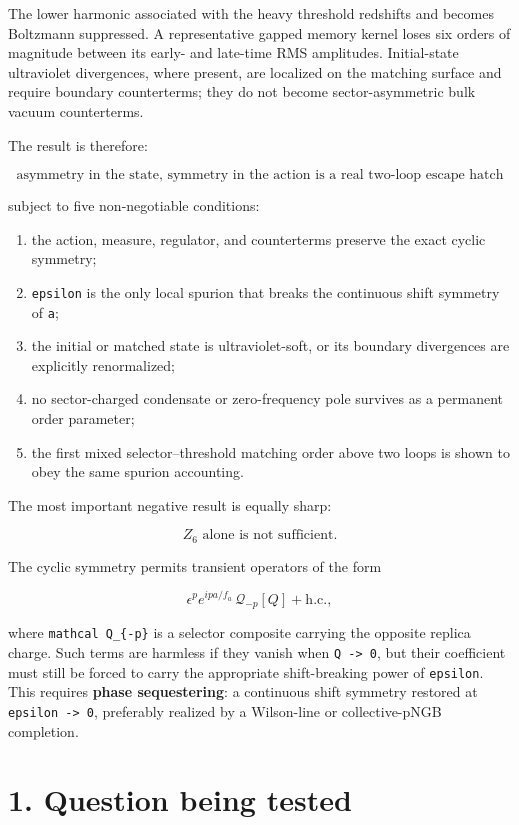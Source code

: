\documentclass[
  10pt,
  a4paper,
]{article}
\providecommand{\tightlist}{%
  \setlength{\itemsep}{0pt}\setlength{\parskip}{0pt}}
\begin{document}
The lower harmonic associated with the heavy threshold redshifts and
becomes Boltzmann suppressed. A representative gapped memory kernel
loses six orders of magnitude between its early- and late-time RMS
amplitudes. Initial-state ultraviolet divergences, where present, are
localized on the matching surface and require boundary counterterms;
they do not become sector-asymmetric bulk vacuum counterterms.

The result is therefore:

\[
\boxed{
\text{asymmetry in the state, symmetry in the action is a real two-loop escape hatch}
}
\]

subject to five non-negotiable conditions:

\begin{enumerate}
\def\labelenumi{\arabic{enumi}.}
\tightlist
\item
  the action, measure, regulator, and counterterms preserve the exact
  cyclic symmetry;
\item
  \texttt{epsilon} is the only local spurion that breaks the continuous
  shift symmetry of \texttt{a};
\item
  the initial or matched state is ultraviolet-soft, or its boundary
  divergences are explicitly renormalized;
\item
  no sector-charged condensate or zero-frequency pole survives as a
  permanent order parameter;
\item
  the first mixed selector--threshold matching order above two loops is
  shown to obey the same spurion accounting.
\end{enumerate}

The most important negative result is equally sharp:

\[
\boxed{
Z_6\text{ alone is not sufficient.}
}
\]

The cyclic symmetry permits transient operators of the form

\[
\epsilon^p e^{ip a/f_a}\,\mathcal Q_{-p}[Q]+\text{h.c.},
\]

where \texttt{mathcal\ Q\_\{-p\}} is a selector composite carrying the
opposite replica charge. Such terms are harmless if they vanish when
\texttt{Q\ -\textgreater{}\ 0}, but their coefficient must still be
forced to carry the appropriate shift-breaking power of
\texttt{epsilon}. This requires \textbf{phase sequestering}: a
continuous shift symmetry restored at
\texttt{epsilon\ -\textgreater{}\ 0}, preferably realized by a
Wilson-line or collective-pNGB completion.

\section{1. Question being tested}\label{question-being-tested}
\end{document}
